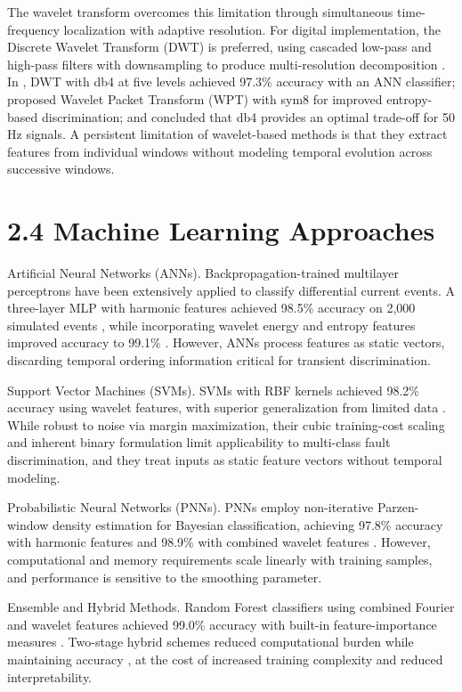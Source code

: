 The wavelet transform overcomes this limitation through simultaneous time-frequency localization with adaptive resolution. For digital implementation, the Discrete Wavelet Transform (DWT) is preferred, using cascaded low-pass and high-pass filters with downsampling to produce multi-resolution decomposition \cite{ref5}. In \cite{ref6}, DWT with db4 at five levels achieved 97.3\% accuracy with an ANN classifier; \cite{ref19} proposed Wavelet Packet Transform (WPT) with sym8 for improved entropy-based discrimination; and \cite{ref14} concluded that db4 provides an optimal trade-off for 50 Hz signals. A persistent limitation of wavelet-based methods is that they extract features from individual windows without modeling temporal evolution across successive windows.


\section{2.4  Machine Learning Approaches}
Artificial Neural Networks (ANNs). Backpropagation-trained multilayer perceptrons have been extensively applied to classify differential current events. A three-layer MLP with harmonic features achieved 98.5\% accuracy on 2,000 simulated events \cite{ref9}, while incorporating wavelet energy and entropy features improved accuracy to 99.1\% \cite{ref10}. However, ANNs process features as static vectors, discarding temporal ordering information critical for transient discrimination.

Support Vector Machines (SVMs). SVMs with RBF kernels achieved 98.2\% accuracy using wavelet features, with superior generalization from limited data \cite{ref13}. While robust to noise via margin maximization, their cubic training-cost scaling and inherent binary formulation limit applicability to multi-class fault discrimination, and they treat inputs as static feature vectors without temporal modeling.

Probabilistic Neural Networks (PNNs). PNNs employ non-iterative Parzen-window density estimation for Bayesian classification, achieving 97.8\% accuracy with harmonic features \cite{ref9} and 98.9\% with combined wavelet features \cite{ref25}. However, computational and memory requirements scale linearly with training samples, and performance is sensitive to the smoothing parameter.

Ensemble and Hybrid Methods. Random Forest classifiers using combined Fourier and wavelet features achieved 99.0\% accuracy with built-in feature-importance measures \cite{ref11}. Two-stage hybrid schemes reduced computational burden while maintaining accuracy \cite{ref34}, at the cost of increased training complexity and reduced interpretability.



